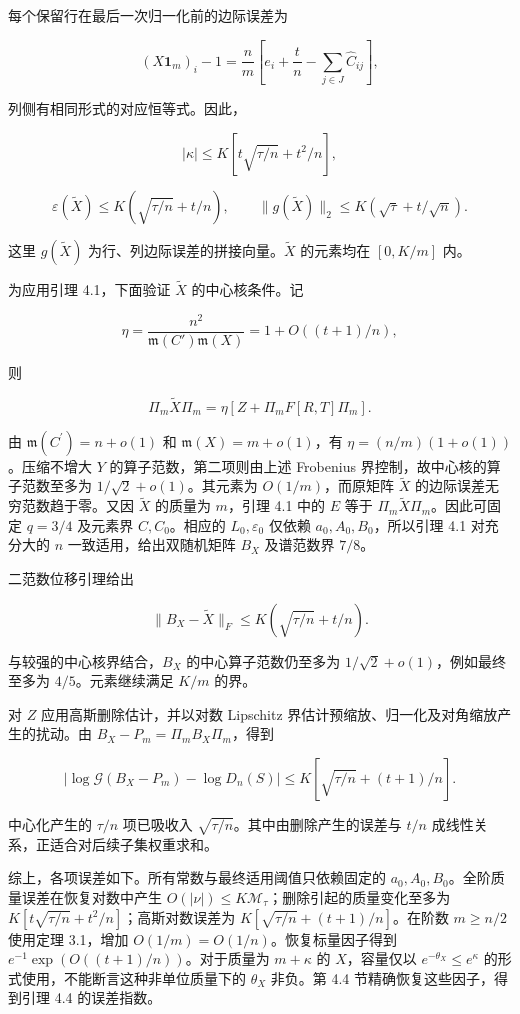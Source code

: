 \documentclass[11pt,a4paper]{article}
\begin{document}
每个保留行在最后一次归一化前的边际误差为

\[
(X\mathbf 1_m)_i-1=\frac n m\left[e_i+\frac t n-\sum_{j\in J}\widehat C_{ij}\right],
\]

列侧有相同形式的对应恒等式。因此，

\[
|\kappa|\le K\left[t\sqrt{\tau/n}+t^2/n\right],
\]

\[
\varepsilon(\widetilde X)\le K(\sqrt{\tau/n}+t/n),\qquad \|g(\widetilde X)\|_2\le K(\sqrt\tau+t/\sqrt n).
\]

这里 \(g(\widetilde X)\) 为行、列边际误差的拼接向量。\(\widetilde X\) 的元素均在 \([0,K/m]\) 内。

为应用引理 4.1，下面验证 \(\widetilde X\) 的中心核条件。记

\[
\eta=\frac{n^2}{\mathfrak m(C')\mathfrak m(X)}=1+O((t+1)/n),
\]

则

\[
\Pi_m\widetilde X\Pi_m=\eta\left[Z+\Pi_mF[R,T]\Pi_m\right].
\]

由 \(\mathfrak m(C^{\prime})=n+o(1)\) 和 \(\mathfrak m(X)=m+o(1)\)，有 \(\eta=(n/m)(1+o(1))\)。压缩不增大 \(Y\) 的算子范数，第二项则由上述 Frobenius 界控制，故中心核的算子范数至多为 \(1/\sqrt2+o(1)\)。其元素为 \(O(1/m)\)，而原矩阵 \(\widetilde X\) 的边际误差无穷范数趋于零。又因 \(\widetilde X\) 的质量为 \(m\)，引理 4.1 中的 \(E\) 等于 \(\Pi_m\widetilde X\Pi_m\)。因此可固定 \(q=3/4\) 及元素界 \(C,C_0\)。相应的 \(L_0,\varepsilon_0\) 仅依赖 \(a_0,A_0,B_0\)，所以引理 4.1 对充分大的 \(n\) 一致适用，给出双随机矩阵 \(B_X\) 及谱范数界 \(7/8\)。

二范数位移引理给出

\[
\|B_X-\widetilde X\|_F\le K(\sqrt{\tau/n}+t/n).
\]

与较强的中心核界结合，\(B_X\) 的中心算子范数仍至多为 \(1/\sqrt2+o(1)\)，例如最终至多为 \(4/5\)。元素继续满足 \(K/m\) 的界。

对 \(Z\) 应用高斯删除估计，并以对数 Lipschitz 界估计预缩放、归一化及对角缩放产生的扰动。由 \(B_X-P_m=\Pi_mB_X\Pi_m\)，得到

\[
|\log\mathcal G(B_X-P_m)-\log D_n(S)|\le K\left[\sqrt{\tau/n}+(t+1)/n\right].
\]

中心化产生的 \(\tau/n\) 项已吸收入 \(\sqrt{\tau/n}\)。其中由删除产生的误差与 \(t/n\) 成线性关系，正适合对后续子集权重求和。

综上，各项误差如下。所有常数与最终适用阈值只依赖固定的 \(a_0,A_0,B_0\)。全阶质量误差在恢复对数中产生 \(O(|\nu|)\le K\mathcal M_\tau\)；删除引起的质量变化至多为 \(K[t\sqrt{\tau/n}+t^2/n]\)；高斯对数误差为 \(K[\sqrt{\tau/n}+(t+1)/n]\)。在阶数 \(m\ge n/2\) 使用定理 3.1，增加 \(O(1/m)=O(1/n)\)。恢复标量因子得到 \(e^{-1}\exp(O((t+1)/n))\)。对于质量为 \(m+\kappa\) 的 \(X\)，容量仅以 \(e^{-\theta_X}\le e^\kappa\) 的形式使用，不能断言这种非单位质量下的 \(\theta_X\) 非负。第 4.4 节精确恢复这些因子，得到引理 4.4 的误差指数。
\end{document}
